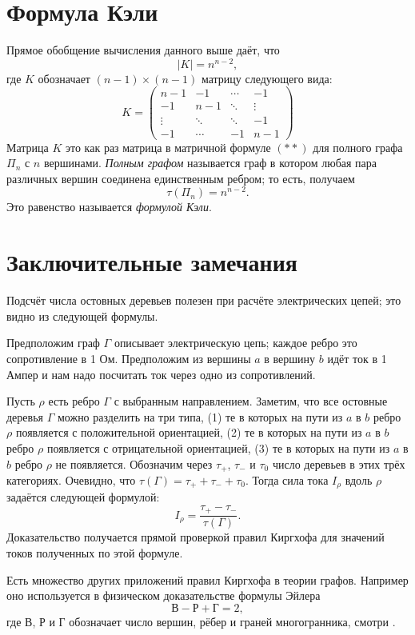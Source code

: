 \documentclass{article}
\begin{document}
\section{Формула Кэли}

Прямое обобщение вычисления данного выше даёт, что
\[|K|=n^{n-2},\]
где $K$ обозначает $(n-1)\times (n-1)$ матрицу следующего вида:
\[
K=\left(
\begin{matrix}
n{-}1&-1&\cdots&-1
\\
-1&n{-}1&\ddots&\vdots
\\
\vdots&\ddots&\ddots&-1
\\
-1&\cdots&-1&n{-}1
\end{matrix}
\right)
\]
Матрица $K$ это как раз матрица в матричной формуле $({*}{*})$ для полного графа $\Pi_n$ с $n$ вершинами.
\emph{Полным графом} называется граф в котором любая пара различных вершин соединена единственным ребром; то есть, получаем 
\[\tau(\Pi_n)=n^{n-2}.\]
Это равенство называется \emph{формулой Кэли}.


\section{Заключительные замечания}

Подсчёт числа остовных деревьев полезен при расчёте электрических цепей;
это видно из следующей формулы.

Предположим граф $\Gamma$ описывает электрическую цепь;
каждое ребро это сопротивление в 1 Ом.
Предположим из вершины $a$ в вершину $b$ идёт ток в 1 Ампер и нам надо посчитать ток через одно из сопротивлений.

Пусть $\rho$ есть ребро $\Gamma$ с выбранным направлением.
Заметим, что все остовные деревья $\Gamma$ можно разделить на три типа,
(1) те в которых на пути из $a$ в $b$ ребро $\rho$ появляется с положительной ориентацией,
(2) те в которых на пути из $a$ в $b$ ребро $\rho$ появляется с отрицательной ориентацией,
(3) те в которых на пути из $a$ в $b$ ребро $\rho$ не появляется.
Обозначим через $\tau_+$, $\tau_-$ и $\tau_0$ число деревьев в этих трёх категориях.
Очевидно, что $\tau(\Gamma)=\tau_++\tau_-+\tau_0$.
Тогда сила тока $I_\rho$ вдоль $\rho$ задаётся следующей формулой:
\[I_\rho=\frac{\tau_+-\tau_-}{\tau(\Gamma)}.\]
Доказательство получается прямой проверкой правил Киргхофа для значений токов полученных по этой формуле.

Есть множество других приложений правил Киргхофа в теории графов. 
Например оно используется в физическом доказательстве формулы Эйлера
\[\text{В}-\text{Р}+\text{Г}=2,\]
где $\text{В}$, $\text{Р}$ и $\text{Г}$ обозначает число вершин, рёбер и граней многогранника,
смотри \cite{levi}.
\end{document}
